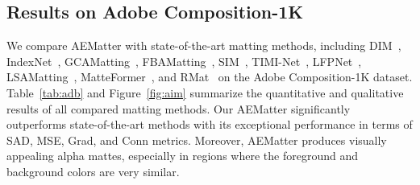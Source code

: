 \documentclass[10pt,twocolumn,letterpaper]{article}
\begin{document}
\subsection{Results on Adobe Composition-1K}
We compare AEMatter with state-of-the-art matting methods, including DIM~\cite{xu2017deep}, IndexNet~\cite{lu2019indices}, GCAMatting~\cite{li2020natural}, FBAMatting~\cite{forte2020fbamatting}, SIM~\cite{sun2021sim}, TIMI-Net~\cite{Liu_2021_ICCV}, LFPNet~\cite{liu2021lfpnet}, LSAMatting~\cite{lsam}, MatteFormer~\cite{park2022matteformer}, and RMat~\cite{dai2022boosting} on the Adobe Composition-1K dataset. 
Table~\ref{tab:adb} and Figure~\ref{fig:aim} summarize the quantitative and qualitative results of all compared matting methods. 
Our AEMatter significantly outperforms state-of-the-art methods with its exceptional performance in terms of SAD, MSE, Grad, and Conn metrics. 
Moreover, AEMatter produces visually appealing alpha mattes, especially in regions where the foreground and background colors are very similar. 
\end{document}
